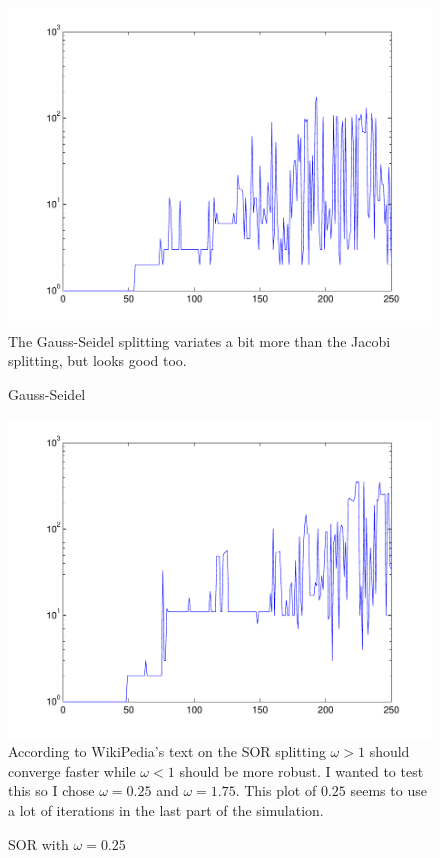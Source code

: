 \documentclass[10pt,oneside,a4paper,final,english]{memoir}
\begin{document}
\begin{figure}[h]
\caption{Gauss-Seidel}
\includegraphics[width=\textwidth]{images/seidel.pdf}
The Gauss-Seidel splitting variates a bit more than the Jacobi
splitting, but looks good too.\end{figure}


\begin{figure}[h]
\caption{SOR with $\omega = 0.25$}
\includegraphics[width=\textwidth]{images/sor_low.pdf}
According to WikiPedia's text on the SOR splitting $\omega > 1$ should
converge faster while $\omega < 1$ should be more robust. I wanted to
test this so I chose $\omega = 0.25$ and $\omega = 1.75$. This plot of
$0.25$ seems to use a lot of iterations in the last part of the
simulation.
\end{figure}
\end{document}
